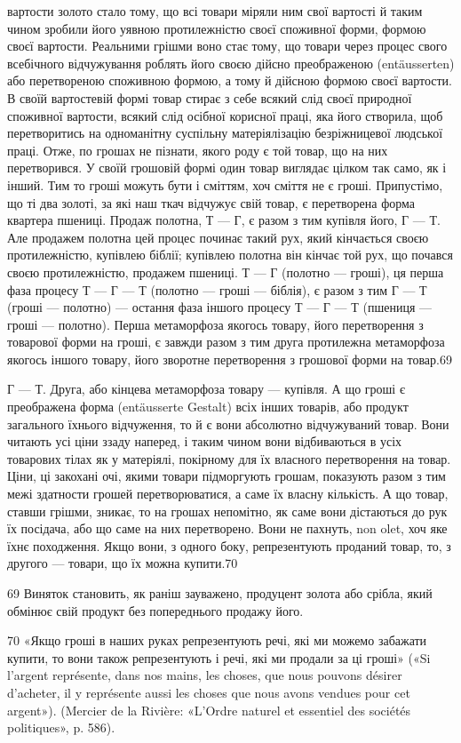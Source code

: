 вартости золото стало тому, що всі товари міряли ним свої вартості
й таким чином зробили його уявною протилежністю своєї
споживної форми, формою своєї вартости. Реальними грішми
воно стає тому, що товари через процес свого всебічного відчужування
роблять його своєю дійсно преображеною (entäusserten)
або перетвореною споживною формою, а тому й дійсною формою
своєї вартости. В своїй вартостевій формі товар стирає з себе
всякий слід своєї природної споживної вартости, всякий слід
осібної корисної праці, яка його створила, щоб перетворитись
на одноманітну суспільну матеріялізацію безріжницевої людської
праці. Отже, по грошах не пізнати, якого роду є той товар,
що на них перетворився. У своїй грошовій формі один товар
виглядає цілком так само, як і інший. Тим то гроші можуть бути
і сміттям, хоч сміття не є гроші. Припустімо, що ті два золоті,
за які наш ткач відчужує свій товар, є перетворена форма квартера
пшениці. Продаж полотна, Т — Г, є разом з тим купівля
його, Г — Т. Але продажем полотна цей процес починає такий
рух, який кінчається своєю протилежністю, купівлею біблії;
купівлею полотна він кінчає той рух, що почався своєю протилежністю,
продажем пшениці. Т — Г (полотно — гроші), ця перша
фаза процесу Т — Г — Т (полотно — гроші — біблія), є разом
з тим Г — Т (гроші — полотно) — остання фаза іншого процесу
Т — Г — Т (пшениця — гроші — полотно). Перша метаморфоза
якогось товару, його перетворення з товарової форми на гроші,
є завжди разом з тим друга протилежна метаморфоза якогось
іншого товару, його зворотне перетворення з грошової форми на
товар.69

Г — Т. Друга, або кінцева метаморфоза товару — купівля.
А що гроші є преображена форма (entäusserte Gestalt) всіх інших
товарів, або продукт загального їхнього відчуження, то й є вони
абсолютно відчужуваний товар. Вони читають усі ціни ззаду
наперед, і таким чином вони відбиваються в усіх товарових тілах
як у матеріялі, покірному для їх власного перетворення на товар.
Ціни, ці закохані очі, якими товари підморгують грошам, показують
разом з тим межі здатности грошей перетворюватися, а
саме їх власну кількість. А що товар, ставши грішми, зникає,
то на грошах непомітно, як саме вони дістаються до рук їх посідача,
або що саме на них перетворено. Вони не пахнуть, non olet,
хоч яке їхнє походження. Якщо вони, з одного боку, репрезентують
проданий товар, то, з другого — товари, що їх можна
купити.70

69  Виняток становить, як раніш зауважено, продуцент золота або
срібла, який обмінює свій продукт без попереднього продажу його.

70  «Якщо гроші в наших руках репрезентують речі, які ми можемо
забажати купити, то вони також репрезентують і речі, які ми продали за
ці гроші» («Si l’argent représente, dans nos mains, les choses, que nous
pouvons désirer d’acheter, il y représente aussi les choses que nous avons
vendues pour cet argent»). (Mercier de la Rivière: «L’Ordre naturel et
essentiel des sociétés politiques», p. 586).
